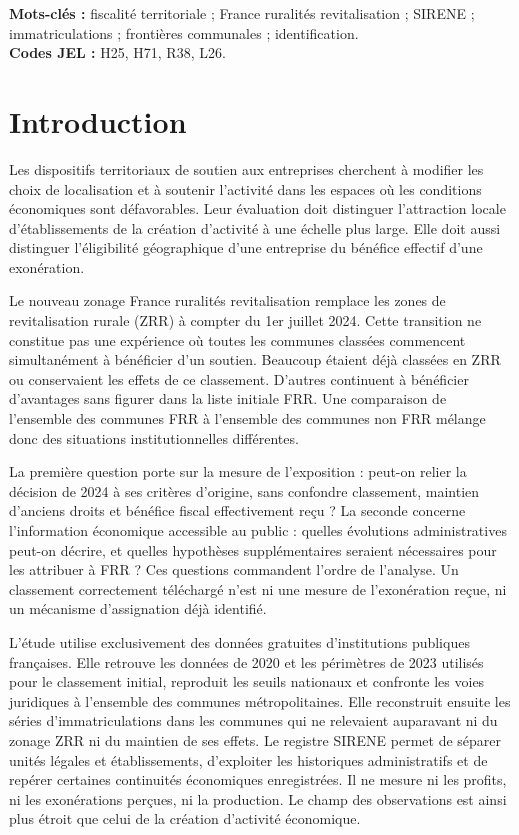 \noindent\textbf{Mots-clés :} fiscalité territoriale ; France ruralités revitalisation ; SIRENE ; immatriculations ; frontières communales ; identification.\\
\textbf{Codes JEL :} H25, H71, R38, L26.

\section{Introduction}
Les dispositifs territoriaux de soutien aux entreprises cherchent à modifier les choix de localisation et à soutenir l’activité dans les espaces où les conditions économiques sont défavorables. Leur évaluation doit distinguer l’attraction locale d’établissements de la création d’activité à une échelle plus large. Elle doit aussi distinguer l’éligibilité géographique d’une entreprise du bénéfice effectif d’une exonération.

Le nouveau zonage France ruralités revitalisation remplace les zones de revitalisation rurale (ZRR) à compter du 1er juillet 2024. Cette transition ne constitue pas une expérience où toutes les communes classées commencent simultanément à bénéficier d’un soutien. Beaucoup étaient déjà classées en ZRR ou conservaient les effets de ce classement. D’autres continuent à bénéficier d’avantages sans figurer dans la liste initiale FRR. Une comparaison de l’ensemble des communes FRR à l’ensemble des communes non FRR mélange donc des situations institutionnelles différentes.

La première question porte sur la mesure de l’exposition : peut-on relier la décision de 2024 à ses critères d’origine, sans confondre classement, maintien d’anciens droits et bénéfice fiscal effectivement reçu ? La seconde concerne l’information économique accessible au public : quelles évolutions administratives peut-on décrire, et quelles hypothèses supplémentaires seraient nécessaires pour les attribuer à FRR ? Ces questions commandent l’ordre de l’analyse. Un classement correctement téléchargé n’est ni une mesure de l’exonération reçue, ni un mécanisme d’assignation déjà identifié.

L’étude utilise exclusivement des données gratuites d’institutions publiques françaises. Elle retrouve les données de 2020 et les périmètres de 2023 utilisés pour le classement initial, reproduit les seuils nationaux et confronte les voies juridiques à l’ensemble des communes métropolitaines. Elle reconstruit ensuite les séries d’immatriculations dans les communes qui ne relevaient auparavant ni du zonage ZRR ni du maintien de ses effets. Le registre SIRENE permet de séparer unités légales et établissements, d’exploiter les historiques administratifs et de repérer certaines continuités économiques enregistrées. Il ne mesure ni les profits, ni les exonérations perçues, ni la production. Le champ des observations est ainsi plus étroit que celui de la création d’activité économique.

